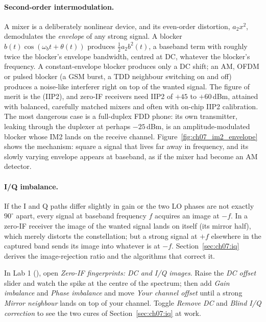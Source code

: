 \paragraph{Second-order intermodulation.} A mixer is a deliberately nonlinear device, and its
even-order distortion, $a_2x^2$, demodulates the \emph{envelope} of any strong signal. A blocker
$b(t)\cos(\omega_bt+\theta(t))$ produces $\tfrac12a_2b^2(t)$, a baseband term with roughly twice the
blocker's envelope bandwidth, centred at DC, whatever the blocker's frequency. A constant-envelope
blocker produces only a DC shift; an AM, OFDM or pulsed blocker (a GSM burst, a TDD neighbour switching
on and off) produces a noise-like interferer right on top of the wanted signal. The figure of merit is
the  (IIP2), and zero-IF receivers need IIP2 of $+45$ to $+60$\,dBm,
attained with balanced, carefully matched mixers and often with on-chip IIP2 calibration. The most
dangerous case is a full-duplex FDD phone: its own transmitter, leaking through the duplexer at perhaps
$-25$\,dBm, is an amplitude-modulated blocker whose IM2 lands on the receive channel.
Figure~\ref{fig:ch07_im2_envelope} shows the mechanism: square a signal that lives far away in
frequency, and its slowly varying envelope appears at baseband, as if the mixer had become an AM
detector.


\paragraph{I/Q imbalance.} If the I and Q paths differ slightly in gain or the two LO phases are not
exactly $90^\circ$ apart, every signal at baseband frequency $f$ acquires an image at $-f$. In a zero-IF
receiver the image of the wanted signal lands on itself (its mirror half), which merely distorts the
constellation; but a strong signal at $+f$ elsewhere in the captured band sends its image into whatever
is at $-f$. Section~\ref{sec:ch07:iq} derives the image-rejection ratio and the algorithms that correct
it.

\begin{tryit}
In Lab 1 (), open \emph{Zero-IF fingerprints: DC and I/Q images}. Raise the
\emph{DC offset} slider and watch the spike at the centre of the spectrum; then add \emph{Gain
imbalance} and \emph{Phase imbalance} and move \emph{Your channel offset} until a strong
\emph{Mirror neighbour} lands on top of your channel. Toggle \emph{Remove DC} and \emph{Blind I/Q
correction} to see the two cures of Section~\ref{sec:ch07:iq} at work.
\end{tryit}

